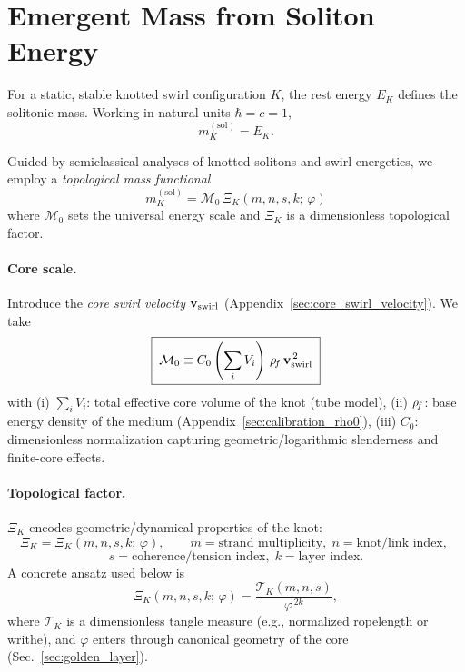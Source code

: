 \section{Emergent Mass from Soliton Energy}
\label{sec:mass-functional}

For a static, stable knotted swirl configuration \(K\), the rest energy \(E_K\) defines the solitonic mass.
Working in natural units \(\hbar=c=1\),
\begin{equation}
 m_K^{(\mathrm{sol})} = E_K .
\end{equation}

Guided by semiclassical analyses of knotted solitons \cite{Faddeev1997} and swirl energetics, we employ a \emph{topological mass functional}
\begin{equation}
 \boxed{ \; m_K^{(\mathrm{sol})} = \mathcal{M}_0 \,\Xi_K(m,n,s,k;\,\varphi) \; }
 \label{eq:mass-functional}
\end{equation}
where \(\mathcal{M}_0\) sets the universal energy scale and \(\Xi_K\) is a dimensionless topological factor.

\paragraph{Core scale.}
Introduce the \emph{core swirl velocity} \(\mathbf{v}_{\mathrm{swirl}}\) (Appendix~\ref{sec:core_swirl_velocity}). We take
\begin{equation}
 \boxed{ \; \mathcal{M}_0 \equiv C_0 \left(\sum_i V_i\right)\,\rho_{\!f}\,\mathbf{v}_{\mathrm{swirl}}^{\,2} \; }
 \label{eq:M0}
\end{equation}
with
(i) \( \sum_i V_i \): total effective core volume of the knot (tube model),
(ii) \( \rho_{\!f} \): base energy density of the medium (Appendix~\ref{sec:calibration_rho0}),
(iii) \(C_0\): dimensionless normalization capturing geometric/logarithmic slenderness and finite-core effects.

\paragraph{Topological factor.}
\(\Xi_K\) encodes geometric/dynamical properties of the knot:
\[
 \Xi_K = \Xi_K(m,n,s,k;\,\varphi), \qquad
 m=\text{strand multiplicity},\; n=\text{knot/link index},\;
\]
\[
 s=\text{coherence/tension index},\;
    k=\text{layer index}.
\]
A concrete ansatz used below is
\begin{equation}
    \Xi_K(m,n,s,k;\,\varphi) = \frac{\mathcal{T}_K(m,n,s)}{\varphi^{\,2k}},
    \label{eq:Xi-ansatz}
\end{equation}
where \(\mathcal{T}_K\) is a dimensionless tangle measure (e.g., normalized ropelength or writhe), and \(\varphi\) enters through canonical geometry of the core (Sec.~\ref{sec:golden_layer}).

